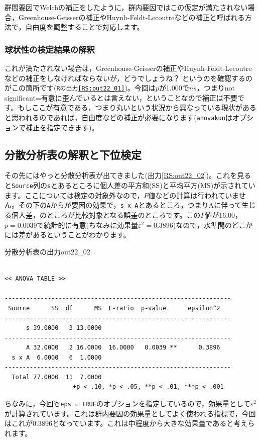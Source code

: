 \documentclass{ltjbook}
\begin{document}
群間要因でWelchの補正をしたように，群内要因ではこの仮定が満たされない場合，Greenhouse-Geisserの補正やHuynh-Feldt-Lecoutreなどの補正と呼ばれる方法で，自由度を調整することで対応します。

\subsubsection{球状性の検定結果の解釈}
これが満たされない場合は，Greenhouse-Geisserの補正やHuynh-Feldt-Lecoutreなどの補正をしなければならないが，どうでしょうね？ というのを確認するのがこの箇所です(\texttt{Rの出力\ref{RS:out22_01}})。今回は$p$が1.000で$ns$，つまりnot significant=有意に歪んでいるとは言えない，ということなので補正は不要です。もしここが有意である，つまり丸いという状況から異なっている現状があると思われるのであれば，自由度などの補正が必要になります(\texttt{anovakun}はオプションで補正を指定できます)。

\subsection{分散分析表の解釈と下位検定}

その先にはやっと分散分析表が出てきました(出力\ref{RS:out22_02})。これを見ると\texttt{Source}列の\texttt{s}とあるところに個人差の平方和(SS)と平均平方(MS)が示されています。ここについては検定の対象外なので，$F$値などの計算は行われていません。その下の\texttt{A}からが要因の効果で，\texttt{s x A}とあるところ，つまりAに伴って生じる個人差，のところが比較対象となる誤差のところです。この$F$値が16.00，$p=0.0039$で統計的に有意(ちなみに効果量$\varepsilon^2=0.3896$)なので，水準間のどこかには差があるということがわかります。

\begin{Rscreen}{分散分析表の出力}{out22_02}
\begin{verbatim}

<< ANOVA TABLE >>

---------------------------------------------------------------
 Source      SS  df      MS  F-ratio  p-value      epsilon^2 
---------------------------------------------------------------
      s 39.0000   3 13.0000                                  
---------------------------------------------------------------
      A 32.0000   2 16.0000  16.0000   0.0039 **      0.3896 
  s x A  6.0000   6  1.0000                                  
---------------------------------------------------------------
  Total 77.0000  11  7.0000                                  
                   +p < .10, *p < .05, **p < .01, ***p < .001
\end{verbatim}
\end{Rscreen}
ちなみに，今回も\verb|eps = TRUE|のオプションを指定しているので，効果量として$\varepsilon^2$が計算されています。これは群内要因の効果量としてよく使われる指標で，今回はこれが$0.3896$となっています。これは中程度から大きな効果量であると考えられます。
\end{document}
